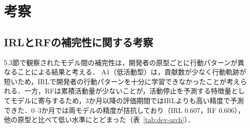\documentclass[submit,noauthor,ses,dvipdfmx]{ipsj}
\begin{document}





\section{考察}\label{sec:discuss}

\subsection{IRLとRFの補完性に関する考察}
5.3節で観察されたモデル間の補完性は，開発者の原型ごとに行動パターンが異なることによる結果と考える．
A1（低活動型）は，貢献数が少なく行動軌跡が短いため，IRLで開発者の行動パターンを十分に学習できなかったことが考えられる．一方，RFは累積活動量が少ないことが，活動停止を予測する特徴量としてモデルに寄与するため，3か月以降の評価期間ではIRLよりも高い精度で予測できた．0--3か月では両モデルの精度が拮抗しており（IRL 0.607，RF 0.606），他の原型と比べて低い水準にとどまった（表~\ref{tab:dev-arch}）．
\end{document}
